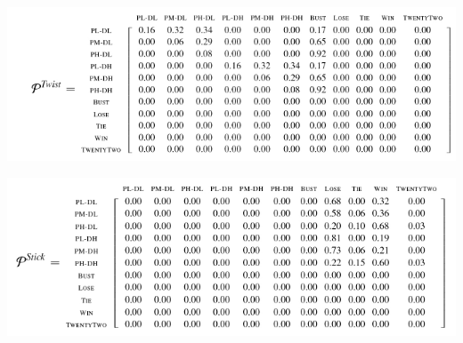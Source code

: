 \documentclass[xcolor={table}]{beamer}
\begin{document}
\begin{frame}
\includegraphics[width=\textwidth]{images/fmlpda_eqn_11_14.pdf}
\end{frame}

\begin{frame}

\includegraphics[width=\textwidth]{images/fmlpda_eqn_11_15.pdf}

\end{frame}
\end{document}
